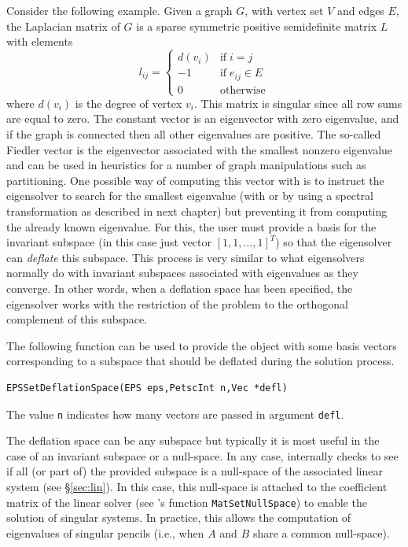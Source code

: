 	Consider the following example. Given a graph $G$, with vertex set $V$ and edges $E$, the Laplacian matrix of $G$ is a sparse symmetric positive semidefinite matrix $L$ with elements
$$l_{ij}=\left\{\begin{array}{cl}
         d(v_i) & \mathrm{if}\;i=j\\
         -1 & \mathrm{if}\;e_{ij}\in E\\
         0&\mathrm{otherwise}
\end{array}\right.$$
where $d(v_i)$ is the degree of vertex $v_i$. This matrix is singular since all row sums are equal to zero. The constant vector is an eigenvector with zero eigenvalue, and if the graph is connected then all other eigenvalues are positive. The so-called Fiedler vector is the eigenvector associated with the smallest nonzero eigenvalue and can be used in heuristics for a number of graph manipulations such as partitioning. One possible way of computing this vector with \slepc is to instruct the eigensolver to search for the smallest eigenvalue (with  or by using a spectral transformation as described in next chapter) but preventing it from computing the already known eigenvalue. For this, the user must provide a basis for the invariant subspace (in this case just vector $[1,1,\ldots,1]^T$) so that the eigensolver can \emph{deflate} this subspace. This process is very similar to what eigensolvers normally do with invariant subspaces associated with eigenvalues as they converge. In other words, when a deflation space has been specified, the eigensolver works with the restriction of the problem to the orthogonal complement of this subspace.

	The following function can be used to provide the  object with some basis vectors corresponding to a subspace that should be deflated during the solution process.
	\begin{Verbatim}[fontsize=\small]
	EPSSetDeflationSpace(EPS eps,PetscInt n,Vec *defl)
	\end{Verbatim}
The value \texttt{n} indicates how many vectors are passed in argument \texttt{defl}.

	The deflation space can be any subspace but typically it is most useful in the case of an invariant subspace or a null-space. In any case, \slepc internally checks to see if all (or part of) the provided subspace is a null-space of the associated linear system (see \S\ref{sec:lin}). In this case, this null-space is attached to the coefficient matrix of the linear solver (see \petsc's function \texttt{MatSetNullSpace}) to enable the solution of singular systems. In practice, this allows the computation of eigenvalues of singular pencils (i.e., when $A$ and $B$ share a common null-space).

